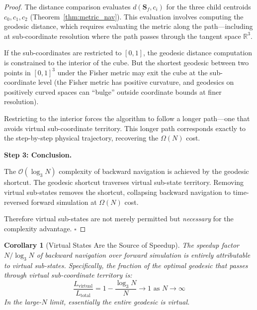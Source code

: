 \documentclass[12pt,twocolumn]{article}
\newtheorem{corollary}[theorem]{Corollary}
\begin{document}
\begin{proof}
The distance comparison evaluates $d(\mathbf{S}_f, c_i)$ for the three child centroids $c_0, c_1, c_2$ (Theorem~\ref{thm:metric_nav}). This evaluation involves computing the geodesic distance, which requires evaluating the metric along the path---including at sub-coordinate resolution where the path passes through the tangent space $\mathbb{R}^3$.

If the sub-coordinates are restricted to $[0,1]$, the geodesic distance computation is constrained to the interior of the cube. But the shortest geodesic between two points in $[0,1]^3$ under the Fisher metric may exit the cube at the sub-coordinate level (the Fisher metric has positive curvature, and geodesics on positively curved spaces can ``bulge'' outside coordinate bounds at finer resolution).

Restricting to the interior forces the algorithm to follow a longer path---one that avoids virtual sub-coordinate territory. This longer path corresponds exactly to the step-by-step physical trajectory, recovering the $\Omega(N)$ cost.

\textbf{Step 3: Conclusion.}

The $\mathcal{O}(\log_3 N)$ complexity of backward navigation is achieved by the geodesic shortcut. The geodesic shortcut traverses virtual sub-state territory. Removing virtual sub-states removes the shortcut, collapsing backward navigation to time-reversed forward simulation at $\Omega(N)$ cost.

Therefore virtual sub-states are not merely permitted but \emph{necessary} for the complexity advantage. $\square$
\end{proof}

\begin{corollary}[Virtual States Are the Source of Speedup]
\label{cor:speedup_source}
The speedup factor $N / \log_3 N$ of backward navigation over forward simulation is entirely attributable to virtual sub-states. Specifically, the fraction of the optimal geodesic that passes through virtual sub-coordinate territory is:
\begin{equation}
\frac{L_{\text{virtual}}}{L_{\text{total}}} = 1 - \frac{\log_3 N}{N} \to 1 \text{ as } N \to \infty
\end{equation}
In the large-$N$ limit, essentially the entire geodesic is virtual.
\end{corollary}
\end{document}
